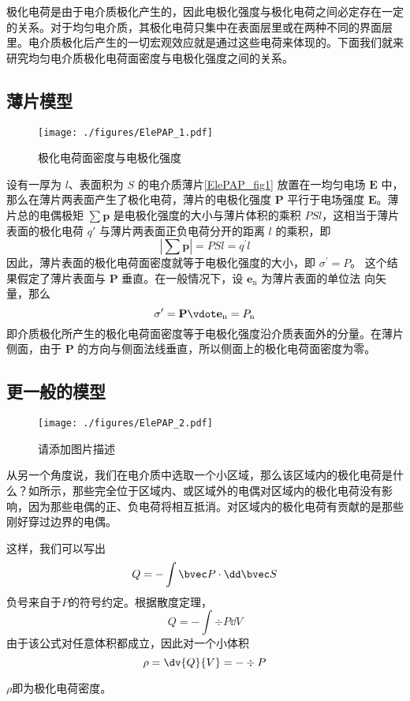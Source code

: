 
\begin{issues}
\end{issues}


极化电荷是由于电介质极化产生的，因此电极化强度与极化电荷之间必定存在一定的关系。对于均匀电介质，其极化电荷只集中在表面层里或在两种不同的界面层里。电介质极化后产生的一切宏观效应就是通过这些电荷来体现的。下面我们就来研究均匀电介质极化电荷面密度与电极化强度之间的关系。

\subsection{薄片模型}
\begin{figure}[ht]
\centering
\texttt{[image: ./figures/ElePAP\_1.pdf]}
\caption{极化电荷面密度与电极化强度} \label{ElePAP_fig1}
\end{figure}
设有一厚为 $l$、表面积为 $S $ 的电介质薄片\autoref{ElePAP_fig1} 放置在一均匀电场 $\mathbf E $ 中，那么在薄片两表面产生了极化电荷，薄片的电极化强度 $\mathbf P $ 平行于电场强度 $\mathbf E$。薄片总的电偶极矩 $\sum \mathbf p$ 是电极化强度的大小与薄片体积的乘积 $PSl$，这相当于薄片表面的极化电荷 $q' $ 与薄片两表面正负电荷分开的距离 $l $ 的乘积，即
\begin{equation}
\left|\sum \mathbf p\right|=P S l=q^{\prime} l
\end{equation}
因此，薄片表面的极化电荷面密度就等于电极化强度的大小，即 $\sigma^{\prime}=P$。
这个结果假定了薄片表面与 $\mathbf P $ 垂直。在一般情况下，设 $\mathbf e_\mathrm{n} $ 为薄片表面的单位法
向矢量，那么
\begin{equation}
\sigma^{\prime}=\mathbf P \vdot \mathbf e_{\mathrm{n}}=P_{\mathrm{n}}
\end{equation}
即介质极化所产生的极化电荷面密度等于电极化强度沿介质表面外的分量。在薄片侧面，由于 $\mathbf P $ 的方向与侧面法线垂直，所以侧面上的极化电荷面密度为零。

\subsection{更一般的模型}
\begin{figure}[ht]
\centering
\texttt{[image: ./figures/ElePAP\_2.pdf]}
\caption{请添加图片描述} \label{ElePAP_fig2}
\end{figure}

从另一个角度说，我们在电介质中选取一个小区域，那么该区域内的极化电荷是什么？如所示，那些完全位于区域内、或区域外的电偶对区域内的极化电荷没有影响，因为那些电偶的正、负电荷将相互抵消。对区域内的极化电荷有贡献的是那些刚好穿过边界的电偶。

这样，我们可以写出
\begin{equation}
Q= - \int \bvec P \cdot \dd \bvec S
\end{equation}
负号来自于$P$的符号约定。根据散度定理，
$$
Q= - \int \div P \dd V
$$
由于该公式对任意体积都成立，因此对一个小体积
$$
\rho = \dv{Q}{V}= - \div P
$$

$\rho$即为极化电荷密度。

